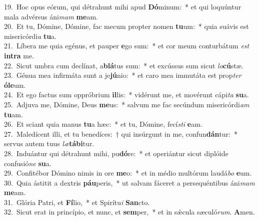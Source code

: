 {19.~}Hoc opus eórum, qui détrahunt mihi apud \textbf{Dó}minum:~* et qui loquúntur mala advérsus áni\textit{mam} \textbf{me}am.\\
{20.~}Et tu, Dómine, Dómine, fac mecum propter nomen \textbf{tu}um:~* quia suávis est misericórdi\textit{a} \textbf{tu}a.\\
{21.~}Líbera me quia egénus, et pauper \textbf{e}go sum:~* et cor meum conturbátum \textit{est} \textbf{in}\textbf{tra} me.\\
{22.~}Sicut umbra cum declínat, a\textbf{blá}tus sum:~* et excússus sum sicut \textit{lo}\textbf{cú}stæ.\\
{23.~}Génua mea infirmáta sunt a je\textbf{jú}nio:~* et caro mea immutáta est prop\textit{ter} \textbf{ó}\textbf{le}um.\\
{24.~}Et ego factus sum oppróbrium \textbf{il}lis:~* vidérunt me, et movérunt cápi\textit{ta} \textbf{su}a.\\
{25.~}Adjuva me, Dómine, Deus \textbf{me}us:~* salvum me fac secúndum misericórdi\textit{am} \textbf{tu}am.\\
{26.~}Et sciant quia manus \textbf{tu}a hæc:~* et tu, Dómine, fecí\textit{sti} \textbf{e}am.\\
{27.~}Maledícent illi, et tu benedíces:~† qui insúrgunt in me, confun\textbf{dán}tur:~* servus autem tuus \textit{læ}\textbf{tá}\textbf{bi}tur.\\
{28.~}Induántur qui détrahunt mihi, pu\textbf{dó}re:~* et operiántur sicut diplóide confusió\textit{ne} \textbf{su}a.\\
{29.~}Confitébor Dómino nimis in ore \textbf{me}o:~* et in médio multórum laudá\textit{bo} \textbf{e}um.\\
{30.~}Quia ástitit a dextris \textbf{páu}peris,~* ut salvam fáceret a persequéntibus áni\textit{mam} \textbf{me}am.\\
{31.~}Glória Patri, et \textbf{Fí}lio,~* et Spirítu\textit{i} \textbf{San}cto.\\
{32.~}Sicut erat in princípio, et nunc, et \textbf{sem}per,~* et in sǽcula sæculó\textit{rum}. \textbf{A}men.\\
